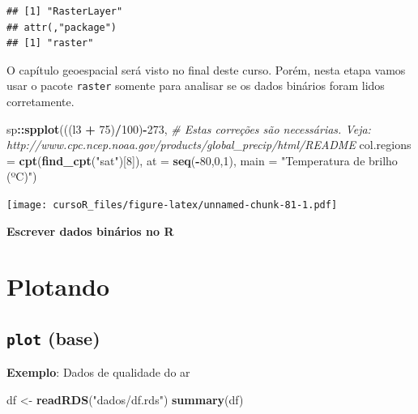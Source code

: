 \documentclass[]{book}
\newenvironment{Shaded}{\begin{snugshade}}{\end{snugshade}}
\newcommand{\KeywordTok}[1]{\textcolor[rgb]{0.13,0.29,0.53}{\textbf{#1}}}
\newcommand{\DataTypeTok}[1]{\textcolor[rgb]{0.13,0.29,0.53}{#1}}
\newcommand{\DecValTok}[1]{\textcolor[rgb]{0.00,0.00,0.81}{#1}}
\newcommand{\StringTok}[1]{\textcolor[rgb]{0.31,0.60,0.02}{#1}}
\newcommand{\CommentTok}[1]{\textcolor[rgb]{0.56,0.35,0.01}{\textit{#1}}}
\newcommand{\OperatorTok}[1]{\textcolor[rgb]{0.81,0.36,0.00}{\textbf{#1}}}
\newcommand{\NormalTok}[1]{#1}
\theoremstyle{definition}
\theoremstyle{definition}
\theoremstyle{definition}
\theoremstyle{remark}
\begin{document}
\begin{verbatim}
## [1] "RasterLayer"
## attr(,"package")
## [1] "raster"
\end{verbatim}

O capítulo geoespacial será visto no final deste curso. Porém, nesta
etapa vamos usar o pacote \texttt{raster} somente para analisar se os
dados binários foram lidos corretamente.

\begin{Shaded}
\begin{Highlighting}[]
\NormalTok{sp}\OperatorTok{::}\KeywordTok{spplot}\NormalTok{(((l3 }\OperatorTok{+}\StringTok{ }\DecValTok{75}\NormalTok{)}\OperatorTok{/}\DecValTok{100}\NormalTok{)}\OperatorTok{-}\DecValTok{273}\NormalTok{, }\CommentTok{# Estas correções são necessárias. Veja: http://www.cpc.ncep.noaa.gov/products/global_precip/html/README}
           \DataTypeTok{col.regions =} \KeywordTok{cpt}\NormalTok{(}\KeywordTok{find_cpt}\NormalTok{(}\StringTok{"sat"}\NormalTok{)[}\DecValTok{8}\NormalTok{]),}
           \DataTypeTok{at =} \KeywordTok{seq}\NormalTok{(}\OperatorTok{-}\DecValTok{80}\NormalTok{,}\DecValTok{0}\NormalTok{,}\DecValTok{1}\NormalTok{),}
           \DataTypeTok{main =} \StringTok{"Temperatura de brilho (ºC)"}\NormalTok{) }
\end{Highlighting}
\end{Shaded}

\texttt{[image: cursoR\_files/figure-latex/unnamed-chunk-81-1.pdf]}

\textbf{Escrever dados binários no R}

\chapter{Plotando}\label{plotando}

\section{\texorpdfstring{\texttt{plot}
(base)}{plot (base)}}\label{plot-base}

\textbf{Exemplo}: Dados de qualidade do ar

\begin{Shaded}
\begin{Highlighting}[]
\NormalTok{df <-}\StringTok{ }\KeywordTok{readRDS}\NormalTok{(}\StringTok{"dados/df.rds"}\NormalTok{)}
\KeywordTok{summary}\NormalTok{(df)}
\end{Highlighting}
\end{Shaded}
\end{document}
